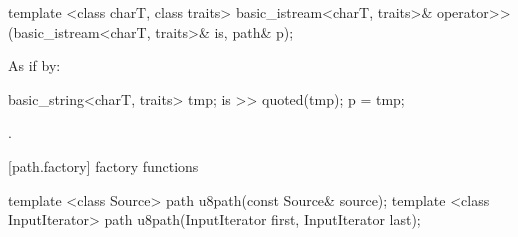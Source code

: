 \begin{itemdecl}
template <class charT, class traits>
  basic_istream<charT, traits>&
    operator>>(basic_istream<charT, traits>& is, path& p);
\end{itemdecl}

\begin{itemdescr}
\pnum
\effects
As if by:
\begin{codeblock}
basic_string<charT, traits> tmp;
is >> quoted(tmp);
p = tmp;
\end{codeblock}

\pnum
\returns {}.
\end{itemdescr}

[path.factory]{ factory functions}

\begin{itemdecl}
template <class Source>
  path u8path(const Source& source);
template <class InputIterator>
  path u8path(InputIterator first, InputIterator last);
\end{itemdecl}

